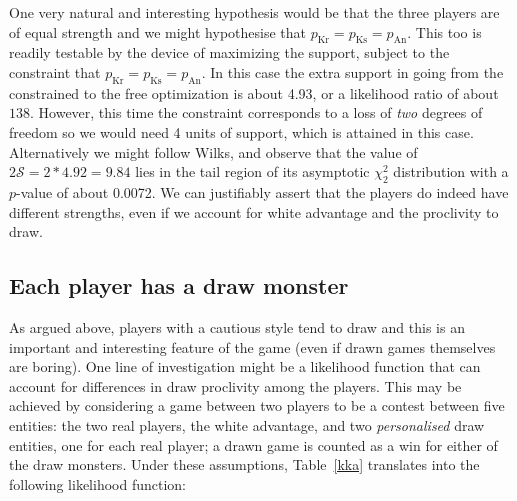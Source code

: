 \documentclass[review]{elsarticle}
\begin{document}
One very natural and interesting hypothesis would be that the three
players are of equal strength
and we might hypothesise that
$p_\mathrm{Kr}=p_\mathrm{Ks}=p_\mathrm{An}$.  This too is readily
testable by the device of maximizing the support, subject to the
constraint that $p_\mathrm{Kr}=p_\mathrm{Ks}=p_\mathrm{An}$.  In this
case the extra support in going from the constrained to the free
optimization is about 4.93, or a likelihood ratio of about $138$.
However, this time the constraint corresponds to a loss of {\em two}
degrees of freedom so we would need 4 units of support, which is
attained in this case.  Alternatively we might follow Wilks, and
observe that the value of $2\mathcal{S}=2*4.92=9.84$ lies in the tail
region of its asymptotic $\chi^2_2$ distribution with a $p$-value of
about 0.0072.  We can justifiably assert that the players do indeed
have different strengths, even if we account for white advantage and
the proclivity to draw.

\subsection{Each player has a draw monster}

As argued above, players with a cautious style tend to draw and this
is an important and interesting feature of the game (even if drawn
games themselves are boring).  One line of investigation might be a
likelihood function that can account for differences in draw
proclivity among the players.  This may be achieved by considering a
game between two players to be a contest between five entities: the
two real players, the white advantage, and two {\em personalised} draw
entities, one for each real player; a drawn game is counted as a win
for either of the draw monsters.  Under these assumptions,
Table~\ref{kka} translates into the following likelihood function:

\end{document}
